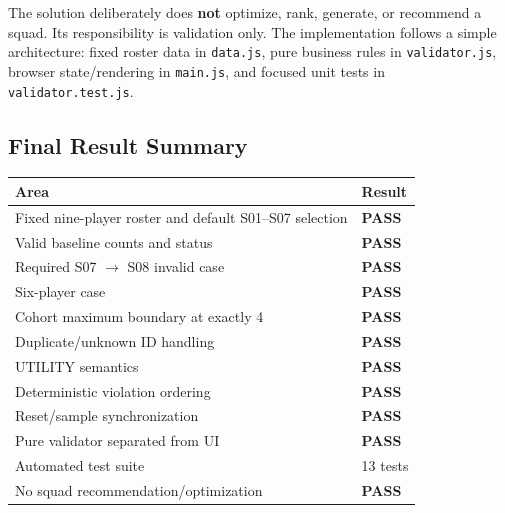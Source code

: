 \documentclass[11pt,a4paper]{article}
\newcommand{\statuspass}{\textbf{\color{green!50!black}PASS}}
\begin{document}
The solution deliberately does \textbf{not} optimize, rank, generate, or recommend a squad. Its responsibility is validation only. The implementation follows a simple architecture: fixed roster data in \texttt{data.js}, pure business rules in \texttt{validator.js}, browser state/rendering in \texttt{main.js}, and focused unit tests in \texttt{validator.test.js}.

\subsection{Final Result Summary}
\begin{tabularx}{\textwidth}{Xl}
\toprule
\textbf{Area} & \textbf{Result} \\
\midrule
Fixed nine-player roster and default S01--S07 selection & \statuspass \\
Valid baseline counts and status & \statuspass \\
Required S07 $\rightarrow$ S08 invalid case & \statuspass \\
Six-player case & \statuspass \\
Cohort maximum boundary at exactly 4 & \statuspass \\
Duplicate/unknown ID handling & \statuspass \\
UTILITY semantics & \statuspass \\
Deterministic violation ordering & \statuspass \\
Reset/sample synchronization & \statuspass \\
Pure validator separated from UI & \statuspass \\
Automated test suite & 13 tests \\
No squad recommendation/optimization & \statuspass \\
\bottomrule
\end{tabularx}
\end{document}
